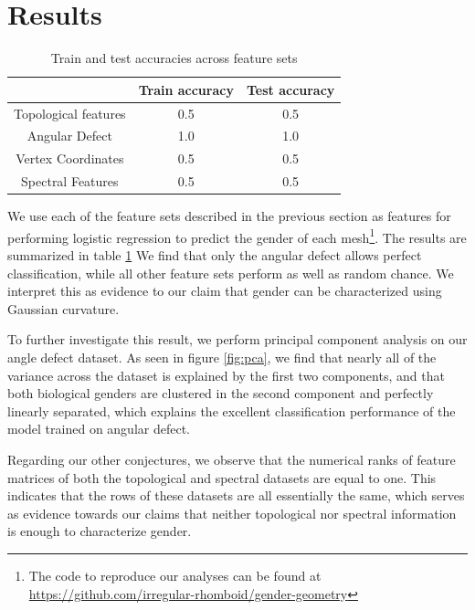 \documentclass[11pt]{article}
\begin{document}
\section{Results}

\begin{table}
    \centering
    \begin{tabular}{c|c|c}
        & \textbf{Train accuracy} & \textbf{Test accuracy}\\ \hline
    Topological features & 0.5 & 0.5 \\
    Angular Defect & 1.0 & 1.0 \\
    Vertex Coordinates & 0.5 & 0.5 \\
    Spectral Features & 0.5 & 0.5\\
    \end{tabular}
    \caption{Train and test accuracies across feature sets} \label{tab:results}
\end{table}

We use each of the feature sets described in the previous section as features for performing logistic regression to predict the gender of each mesh\footnote{The code to reproduce our analyses can be found at \url{https://github.com/irregular-rhomboid/gender-geometry}}. The results are summarized in table \ref{tab:results} We find that only the angular defect allows perfect classification, while all other feature sets perform as well as random chance. We interpret this as evidence to our claim that gender can be characterized using Gaussian curvature.

To further investigate this result, we perform principal component analysis on our angle defect dataset. As seen in figure \ref{fig:pca}, we find that nearly all of the variance across the dataset is explained by the first two components, and that both biological genders are clustered in the second component and perfectly linearly separated, which explains the excellent classification performance of the model trained on angular defect.

Regarding our other conjectures, we observe that the numerical ranks of feature matrices of both the topological and spectral datasets are equal to one. This indicates that the rows of these datasets are all essentially the same, which serves as evidence towards our claims that neither topological nor spectral information is enough to characterize gender.
\end{document}

